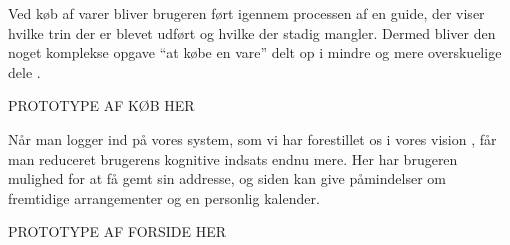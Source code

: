 Ved køb af varer bliver brugeren ført igennem processen af en guide, der viser hvilke trin der er blevet udført og hvilke der stadig mangler. Dermed bliver den noget komplekse opgave ``at købe en vare'' delt op i mindre og mere overskuelige dele \cite[s. 333]{Benyon2010}.

PROTOTYPE AF KØB HER

Når man logger ind på vores system, som vi har forestillet os i vores vision \cite{osos}, får man reduceret brugerens kognitive indsats endnu mere. Her har brugeren mulighed for at få gemt sin addresse, og siden kan give påmindelser om fremtidige arrangementer og en personlig kalender.

PROTOTYPE AF FORSIDE HER
